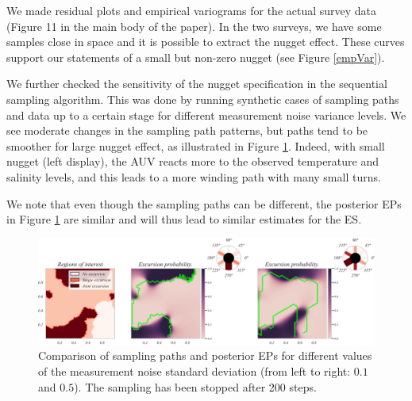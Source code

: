 \documentclass[aoas]{imsart}
\begin{document}
We made residual plots and empirical variograms for the actual survey data (Figure 11 in the main body of the paper). In the two surveys, we have some samples close in space and it is possible to extract the nugget effect. These curves support our statements of a small but non-zero nugget (see Figure \ref{empVar}).

We further checked the sensitivity of the nugget specification in the sequential sampling algorithm. This was done by running synthetic cases of sampling paths and data up to a certain stage for different measurement noise variance levels. We see moderate changes in the sampling path patterns, but paths tend to be smoother for large nugget effect, as illustrated in Figure \ref{fig:nugget_comparison}.
Indeed, with small nugget (left display), the AUV reacts more to the observed temperature and salinity levels, and this leads to a more winding path with many small turns.

We note that even though the sampling paths can be different, the posterior EPs in Figure \ref{fig:nugget_comparison} are similar and will thus lead to similar estimates for the ES. 

\begin{figure}[h]
    \centering
    \includegraphics[scale=0.41]{ans_to_reviewers/merged_paths_2.png}
    \caption{Comparison of sampling paths and posterior EPs for different values of the measurement noise standard deviation (from left to right: $0.1$ and $0.5$). The sampling has been stopped after 200 steps.}
    \label{fig:nugget_comparison}
\end{figure}


\footnotesize


\end{document}
